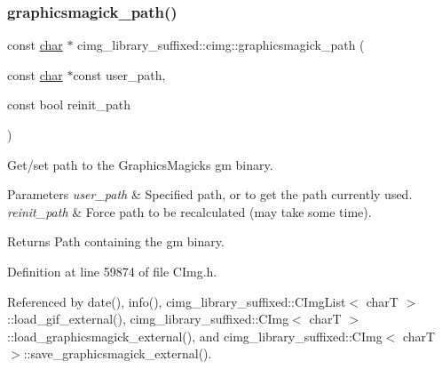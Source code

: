 \mbox{\label{namespacecimg__library__suffixed_1_1cimg_ab4063d8fb2c2564596f33f4a75436f76}} 
\subsubsection{\texorpdfstring{graphicsmagick\+\_\+path()}{graphicsmagick\_path()}}
{\footnotesize\ttfamily const \hyperlink{classchar}{char} $\ast$ cimg\+\_\+library\+\_\+suffixed\+::cimg\+::graphicsmagick\+\_\+path (\begin{DoxyParamCaption}\item[{const \hyperlink{classchar}{char} $\ast$const}]{user\+\_\+path,  }\item[{const bool}]{reinit\+\_\+path }\end{DoxyParamCaption})\hspace{0.3cm}{\ttfamily [inline]}}



Get/set path to the Graphics\+Magick\textquotesingle{}s {\ttfamily gm} binary. 


\begin{DoxyParams}{Parameters}
{\em user\+\_\+path} & Specified path, or {} to get the path currently used. \\
\hline
{\em reinit\+\_\+path} & Force path to be recalculated (may take some time). \\
\hline
\end{DoxyParams}
\begin{DoxyReturn}{Returns}
Path containing the {\ttfamily gm} binary. 
\end{DoxyReturn}


Definition at line 59874 of file C\+Img.\+h.



Referenced by date(), info(), cimg\+\_\+library\+\_\+suffixed\+::\+C\+Img\+List$<$ char\+T $>$\+::load\+\_\+gif\+\_\+external(), cimg\+\_\+library\+\_\+suffixed\+::\+C\+Img$<$ char\+T $>$\+::load\+\_\+graphicsmagick\+\_\+external(), and cimg\+\_\+library\+\_\+suffixed\+::\+C\+Img$<$ char\+T $>$\+::save\+\_\+graphicsmagick\+\_\+external().

